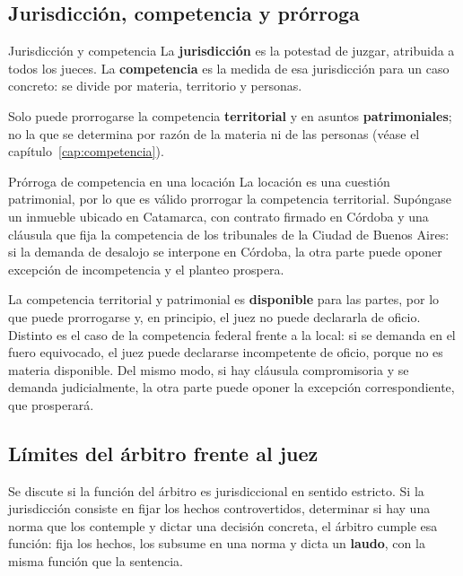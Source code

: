 \documentclass[12pt,oneside]{book}
\begin{document}
\subsection{Jurisdicción, competencia y prórroga}

\begin{definition}{Jurisdicción y competencia}
La \textbf{jurisdicción} es la potestad de juzgar, atribuida a todos los jueces. La \textbf{competencia} es la medida de esa jurisdicción para un caso concreto: se divide por materia, territorio y personas.
\end{definition}

Solo puede prorrogarse la competencia \textbf{territorial} y en asuntos \textbf{patrimoniales}; no la que se determina por razón de la materia ni de las personas (véase el capítulo~\ref{cap:competencia}).

\begin{example}{Prórroga de competencia en una locación}
La locación es una cuestión patrimonial, por lo que es válido prorrogar la competencia territorial. Supóngase un inmueble ubicado en Catamarca, con contrato firmado en Córdoba y una cláusula que fija la competencia de los tribunales de la Ciudad de Buenos Aires: si la demanda de desalojo se interpone en Córdoba, la otra parte puede oponer excepción de incompetencia y el planteo prospera.
\end{example}

\begin{note}
La competencia territorial y patrimonial es \textbf{disponible} para las partes, por lo que puede prorrogarse y, en principio, el juez no puede declararla de oficio. Distinto es el caso de la competencia federal frente a la local: si se demanda en el fuero equivocado, el juez puede declararse incompetente de oficio, porque no es materia disponible. Del mismo modo, si hay cláusula compromisoria y se demanda judicialmente, la otra parte puede oponer la excepción correspondiente, que prosperará.
\end{note}

\subsection{Límites del árbitro frente al juez}

Se discute si la función del árbitro es jurisdiccional en sentido estricto. Si la jurisdicción consiste en fijar los hechos controvertidos, determinar si hay una norma que los contemple y dictar una decisión concreta, el árbitro cumple esa función: fija los hechos, los subsume en una norma y dicta un \textbf{laudo}, con la misma función que la sentencia.
\end{document}
